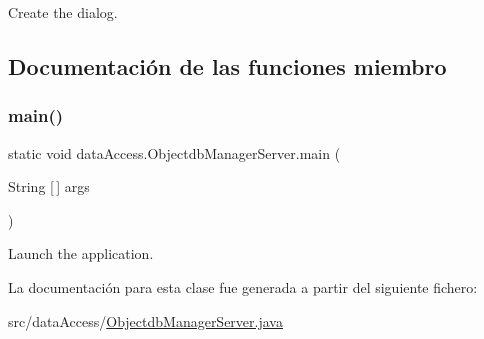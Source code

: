 Create the dialog. 

\subsection{Documentación de las funciones miembro}
\mbox{\label{classdata_access_1_1_objectdb_manager_server_a2e0f5eddf461be78de905ca56e4295f9}} 
\subsubsection{\texorpdfstring{main()}{main()}}
{\footnotesize\ttfamily static void data\+Access.\+Objectdb\+Manager\+Server.\+main (\begin{DoxyParamCaption}\item[{String \mbox{[}$\,$\mbox{]}}]{args }\end{DoxyParamCaption})\hspace{0.3cm}{\ttfamily [static]}}

Launch the application. 

La documentación para esta clase fue generada a partir del siguiente fichero\+:\begin{DoxyCompactItemize}
\item 
src/data\+Access/\mbox{\hyperlink{_objectdb_manager_server_8java}{Objectdb\+Manager\+Server.\+java}}\end{DoxyCompactItemize}
